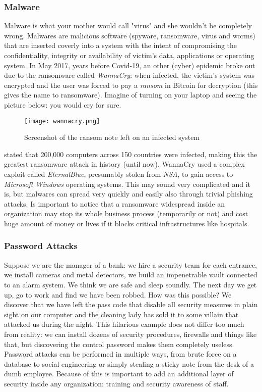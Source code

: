 \subsubsection{Malware}
Malware is what your mother would call "virus" and she wouldn't be completely wrong. Malwares are malicious software (spyware, ransomware, virus and worms) that are inserted coverly into a system with the intent of compromising the confidentiality, integrity or availability of victim's data, applications or operating system. In May 2017, years before Covid-19, an other (cyber) epidemic broke out due to the ransomware called \textit{WannaCry}: when infected, the victim's system was encrypted and the user was forced to pay a \textit{ransom} in Bitcoin for decryption (this gives the name to ransomware). Imagine of turning on your laptop and seeing the picture below: you would cry for sure.
\begin{figure}[H]
  \centering
    \texttt{[image: wannacry.png]}
  \caption{Screenshot of the ransom note left on an infected system}
  \label{fig:wannacry}
\end{figure}
\FloatBarrier
\noindent
\cite{Furnell2017} stated that 200,000 computers across 150 countries were infected, making this the greatest ransomware attack in history (until now). WannaCry used a complex exploit called \textit{EternalBlue}, presumably stolen from \textit{NSA}, to gain access to \textit{Microsoft Windows} operating systems. This may sound very complicated and it is, but malwares can spread very quickly and easily also through trivial phishing attacks. Is important to notice that a ransomware widespread inside an organization may stop its whole business process (temporarily or not) and cost huge amount of money or lives if it blocks critical infrastructures like hospitals.

\subsubsection{Password Attacks}
Suppose we are the manager of a bank: we hire a security team for each entrance, we install cameras and metal detectors, we build an impenetrable vault connected to an alarm system. We think we are safe and sleep soundly. The next day we get up, go to work and find we have been robbed. How was this possible? We discover that we have left the pass code that disable all security measures in plain sight on our computer and the cleaning lady has sold it to some villain that attacked us during the night. This hilarious example does not differ too much from reality: we can install dozens of security procedures, firewalls and things like that, but discovering the control password makes them completely useless. Password attacks can be performed in multiple ways, from brute force on a database to social engineering or simply stealing a sticky note from the desk of a dumb employee. Because of this is important to add an additional layer of security inside any organization: training and security awareness of staff.


